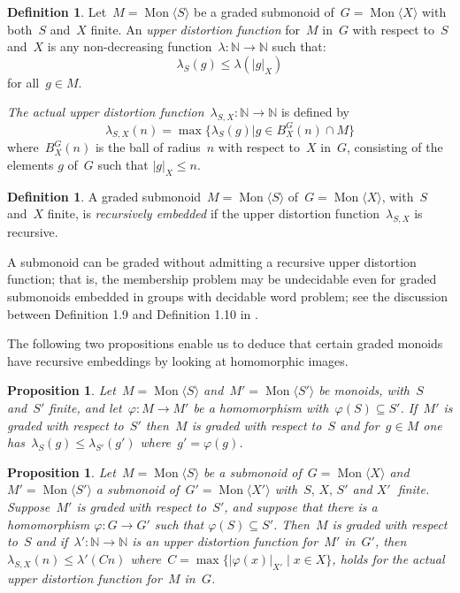 \documentclass[11pt]{amsart}
\newcommand{\Mgen}[1]{\operatorname{Mon}\bigl\langle #1 \bigr\rangle}
\newcommand{\N}{\mathbb{N}}
\theoremstyle{plain}
\newtheorem{prop}[theorem]{Proposition}
\theoremstyle{definition}
\newtheorem{mydef}[theorem]{Definition}
\begin{document}
\begin{mydef}
Let~$M = \Mgen{S}$ be a graded submonoid of~$G = \Mgen{X}$ with both~$S$ and~$X$ finite. An  \emph{upper distortion function} for~$M$ in~$G$ with respect to~$S$ and~$X$ is any non-decreasing function~$\lambda \colon \N \rightarrow \N$ such that:
\[
\lambda_S(g) \leq \lambda ( | g |_X )
\]
for all~$g \in M$.
\end{mydef}

\emph{The actual upper distortion function}~$\lambda_{S, X} \colon \N \rightarrow \N$ is defined by
\[
\lambda_{S, X}(n) = \max\{\lambda_S(g) | g \in B_X^G(n) \cap M\}
\]
where~$B_X^G(n)$ is the ball of radius~$n$ with respect to~$X$ in~$G$, consisting of the elements $g$ of~$G$ such that
$|g|_X \leq n$.





\begin{mydef}
A graded submonoid~$M = \Mgen{S}$ of~$G = \Mgen{X}$, with~$S$ and~$X$ finite, is \emph{recursively embedded} if the upper distortion function~$\lambda_{S, X}$ is recursive.
\end{mydef}

A submonoid can be graded without admitting a recursive upper distortion function; that is, the membership problem may be undecidable even for graded submonoids embedded in groups with decidable word problem; see the discussion between Definition 1.9 and Definition 1.10 in \cite{margolis2005distortion}. 






The following two propositions 
enable us to deduce that certain graded monoids have recursive embeddings by looking at homomorphic images.

\begin{prop}\cite[Proposition~1.11]{margolis2005distortion}
Let~$M = \Mgen{S}$ and~$M' = \Mgen{S'}$ be monoids, with~$S$ and~$S'$ finite, and let~$\varphi \colon M \rightarrow M'$ be a homomorphism with~$\varphi(S) \subseteq S'$. If~$M'$ is graded with respect to~$S'$ then~$M$ is graded with respect to~$S$ and for~$g \in M$ one has~$\lambda_S(g) \leq \lambda_{S'}(g')$ where~$g' = \varphi(g)$.
\end{prop}


\begin{prop}\cite[Proposition~1.12]{margolis2005distortion}\label{prop: homomorphisms and gradings}
Let~$M = \Mgen{S}$ be a submonoid of~$G = \Mgen{X}$ and~$M' = \Mgen{S'}$ a submonoid of~$G' = \Mgen{X'}$ with~$S, \, X, \, S'$ and  $X'~$ finite. 
Suppose~$M'$ is graded with respect to~$S'$, and suppose that there is a homomorphism 
$\varphi \colon G \rightarrow G'$ such that $\varphi(S) \subseteq S'$. 
Then~$M$ is graded with respect to~$S$ and if~$\lambda' \colon \N \rightarrow \N$ is an upper distortion function for~$M'$ in~$G'$, then~$\lambda_{S, X}(n) \leq \lambda'(Cn)$ where~$C = \max\{|\varphi (x)|_{X'} \mid x \in X\}$, holds for the actual upper distortion function for~$M$ in~$G$.
\end{prop}
\end{document}
